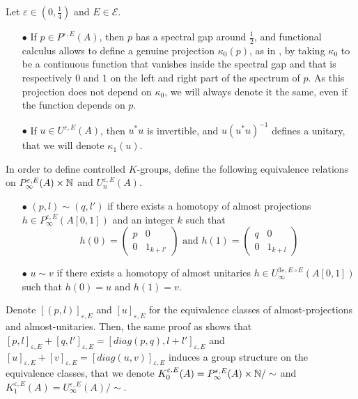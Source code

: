 \begin{rk}Let $\varepsilon\in (0,\frac{1}{4})$ and $E\in\mathcal E$.\\
\begin{itemize}
\item[$\bullet$] If $p\in P^{\varepsilon,E}(A)$, then $p$ has a spectral gap around $\frac{1}{2}$, and functional calculus allows to define a genuine projection $\kappa_0(p)$, as in \cite{OY2}, by taking $\kappa_0$ to be a continuous function that vanishes inside the spectral gap and that is respectively $0$ and $1$ on the left and right part of the spectrum of $p$. As this projection does not depend on $\kappa_0$, we will always denote it the same, even if the function depends on $p$.\\
\item[$\bullet$] If $u\in U^{\varepsilon,E}(A)$, then $u^* u$ is invertible, and $u(u^* u)^{-1}$ defines a unitary, that we will denote $\kappa_1(u)$.
\end{itemize}
\end{rk}

In order to define controlled $K$-groups, define the following equivalence relations on $P^{\varepsilon, E}_\infty(A)\times \mathbb N$ and $U^{\varepsilon,E}_n(A)$.\\

\begin{itemize}

\item[$\bullet$] $(p,l) \sim (q,l')$ if there exists a homotopy of almost projections $h\in P^{\varepsilon, E}_\infty(A[0,1])$ and an integer $k$ such that 
\[h(0)=\begin{pmatrix} p & 0 \\ 0 & 1_{k+l'} \end{pmatrix} \text{ and }
h(1)=\begin{pmatrix} q & 0 \\ 0 & 1_{k+l} \end{pmatrix}\]
\item[$\bullet$] $u \sim v$ if there exists a homotopy of almost unitaries $h\in U^{3\varepsilon, E\circ E}_\infty(A[0,1])$ such that $h(0)= u \text{ and }h(1)=v$.\\
\end{itemize}

Denote $[(p,l)]_{\varepsilon,E}$ and $[u]_{\varepsilon,E}$ for the equivalence classes of almost-projections and almost-unitaries. Then, the same proof as \cite{OY2} shows that $[p,l]_{\varepsilon,E}+[q,l']_{\varepsilon,E}=[diag(p,q),l+l']_{\varepsilon,E}$ and $[u]_{\varepsilon,E}+[v]_{\varepsilon,E}=[diag(u,v)]_{\varepsilon,E}$ induces a group structure on the equivalence classes, that we denote $K_0^{\varepsilon,E}(A) = P^{\varepsilon, E}_\infty(A)\times \mathbb N / \sim$ and $K_1^{\varepsilon,E}(A) = U^{\varepsilon, E}_\infty(A) / \sim$.\\

